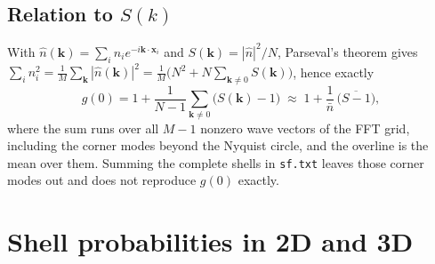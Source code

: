 \documentclass[11pt]{article}
\newcommand{\code}[1]{\texttt{#1}}
\newcommand{\nb}{\bar n}
\begin{document}
\subsection{\texorpdfstring{Relation to $S(k)$}{Relation to S(k)}}
With $\hat n(\mathbf k)=\sum_in_ie^{-i\mathbf k\cdot\mathbf x_i}$ and
$S(\mathbf k)=|\hat n|^2/N$, Parseval's theorem gives
$\sum_in_i^2=\frac1M\sum_{\mathbf k}|\hat n(\mathbf k)|^2
=\frac1M\bigl(N^2+N\sum_{\mathbf k\ne0}S(\mathbf k)\bigr)$, hence exactly
\begin{equation}
  g(0) = 1+\frac{1}{N-1}\sum_{\mathbf k\ne0}\bigl(S(\mathbf k)-1\bigr)
  \;\approx\; 1+\frac{1}{\nb}\,\overline{\bigl(S-1\bigr)} ,
\end{equation}
where the sum runs over all $M-1$ nonzero wave vectors of the FFT grid,
including the corner modes beyond the Nyquist circle, and the overline is the
mean over them. Summing the complete shells in \code{sf.txt} leaves those
corner modes out and does not reproduce $g(0)$ exactly.

\section{Shell probabilities in 2D and 3D}
\end{document}
